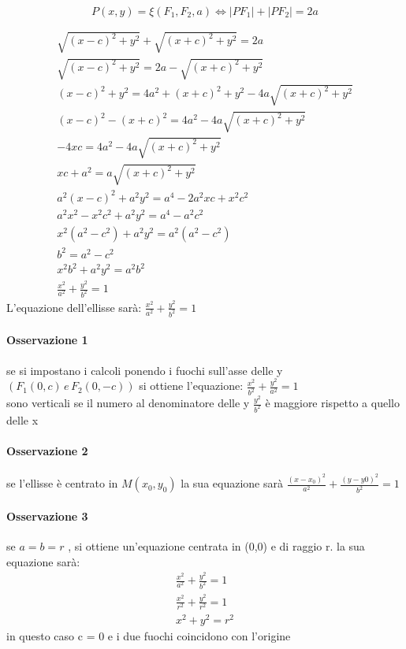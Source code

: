 \documentclass[a4paper,11pt]{article}
\begin{document}
\begin{center}
    \[
    P(x,y) = \xi  (F_1 , F_2 , a)  \Longleftrightarrow \left\lvert PF_1 \right\rvert + \left\lvert PF_2 \right\rvert = 2a  
    \]
\end{center}

\begin{align*}
    \sqrt{(x-c)^2 + y^2          } + \sqrt{(x+c)^2 + y^2} = 2a 
    \\
    \sqrt{(x-c)^2 + y^2          } = 2a - \sqrt{(x+c)^2 + y^2} 
     \\
     (x-c)^2 + y^2 = 4a^2 + (x+c)^2 + y^2 -4a\sqrt{(x+c)^2 + y^2}
     \\
     (x-c)^2 - (x+c)^2 = 4a^2 -4a\sqrt{(x+c)^2 + y^2}
     \\
    -4xc = 4a^2 -4a\sqrt{(x+c)^2 + y^2}
    \\
    xc + a^2 = a\sqrt{(x+c)^2 + y^2}
    \\
    a^2 (x-c)^2 + a^2 y^2 = a^4 -2a^2 xc + x^2 c^2
    \\
    a^2 x^2 - x^2 c^2 + a^2 y^2 = a^4 - a^2 c^2
    \\
    x^2 ( a^2 - c^2 ) + a^2 y^2 = a^2(a^2 - c^2)
    \\
    b^2 = a^2 - c^2 
    \\
    x^2 b^2 + a^2 y^2 = a^2 b^2 
    \\
    \frac{x^2}{a^2} + \frac{y^2}{b^2} = 1
\end{align*}
L'equazione dell'ellisse sarà: \(     \frac{x^2}{a^2} + \frac{y^2}{b^2} = 1  \) 
\paragraph{Osservazione 1}
 se si impostano i calcoli ponendo i fuochi sull'asse delle y \(  (F_1(0,c) \, e \, F_2(0,-c) )    \) si ottiene l'equazione: \(       \frac{x^2}{b^2} + \frac{y^2}{a^2} = 1 \)     
\\
sono verticali se il numero al denominatore delle y \(  \frac{y^2}{b^2} \) è maggiore rispetto a quello delle x
\paragraph{Osservazione 2}
se l'ellisse è centrato in \( M(x_0,y_0)  \) la sua equazione sarà \( \frac{(x-x_0)^2}{a^2} + \frac{(y-y0)^2}{b^2} = 1 \)
\paragraph{Osservazione 3}
se \( a = b = r  \) , si ottiene un'equazione centrata in (0,0) e di raggio r. la sua equazione sarà:
\begin{align*}
    \frac{x^2}{a^2} + \frac{y^2}{b^2} = 1
    \\
    \frac{x^2}{r^2} + \frac{y^2}{r^2} = 1
    \\
    x^2 + y^2 = r^2 
\end{align*}   
in questo caso c = 0 e i due fuochi coincidono con l'origine
\end{document}
